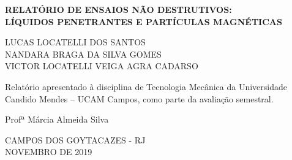 \begin{titlepage}
    \begin{center}

        \uppercase{\large\textbf{relatório de ensaios não destrutivos:\\líquidos penetrantes e partículas magnéticas}}
        
        \vspace*{2.5cm}
        \normalsize\uppercase{
        Lucas Locatelli dos Santos \\ 
        Nandara Braga da Silva Gomes \\ 
        Victor Locatelli Veiga Agra Cadarso}
 
 
        \vfill
            \begin{flushright}
                        \begin{minipage}{8cm}            
            Relatório apresentado à disciplina de Tecnologia Mecânica da Universidade Candido Mendes – UCAM Campos, como parte da avaliação semestral.
            \end{minipage}
            \end{flushright}
        \vfill
        \normalsize
        \begin{center}
        Profª Márcia Almeida Silva
        \end{center}

        \vfill

        \normalsize
        \uppercase{
        Campos dos Goytacazes - RJ
        \\
        Novembro de 2019
        }
    \end{center}
\end{titlepage}